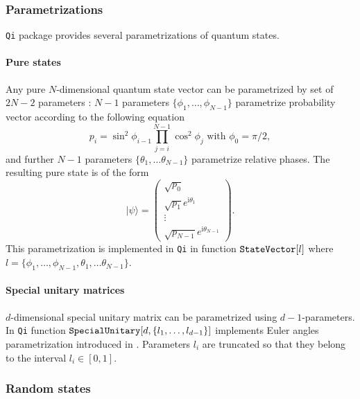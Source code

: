 \documentclass[11pt,a4paper]{article}
\newcommand{\qi}{\texttt{Qi}}
\newcommand{\ket}[1]{\ensuremath{|#1\rangle}}
\newcommand{\1}{{\bf 1}}
\newcommand{\ii}{\mathrm{i}}
\newcommand{\fname}[1]{\text{\texttt{#1}}}
\begin{document}
\subsubsection{Parametrizations}
\qi{} package provides several parametrizations of quantum states. 

\paragraph{Pure states}
Any pure $N$-dimensional quantum state vector can be parametrized by set of 
$2N-2$ parameters \cite{vedra98entanglement}: $N-1$ parameters $\{\phi_1, 
\ldots, 
\phi_{N-1}\}$ parametrize probability vector according to the following equation
\begin{equation}
p_i=\sin^2\phi_{i-1} \prod\limits_{j=i}^{N-1}\cos^2\phi_j\text{\ \ with 
}\phi_0=\pi/2,
\end{equation}
and further $N-1$ parameters $\{\theta_1, \ldots
\theta_{N-1}\}$ parametrize relative phases. The resulting pure state 
is of the form
\begin{equation}
\ket{\psi}=
\left(
\begin{array}{c}
\sqrt{p_0}\\
\sqrt{p_1}e^{\ii \theta_1}\\
\vdots\\
\sqrt{p_{N-1}}e^{\ii \theta_{N-1}}
\end{array}
\right).
\end{equation}
This parametrization is implemented in \qi{} in function
$\fname{StateVector}[l]$ where $l=\{\phi_1, \ldots, \phi_{N-1}, \theta_1, \ldots
\theta_{N-1}\}$.

\paragraph{Special unitary matrices}
$d$-dimensional special unitary matrix can be parametrized using
$d-1$-parameters. In \qi{} function
$\fname{SpecialUnitary}[d,\{l_1,\ldots,l_{d-1}\}]$ implements Euler angles
parametrization introduced in \cite{zyczkowski94random}. Parameters $l_i$ are
truncated so that they belong to the interval $l_i\in [0,1]$.
\subsubsection{Random states}
\end{document}
